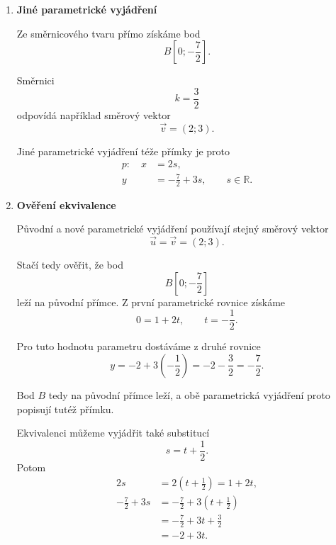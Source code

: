 \begin{example}
\begin{enumerate}[label=\alph*), leftmargin=2em]
        Směrnicový tvar přímky je
        \[
            p:y=\frac{3}{2}x-\frac{7}{2}.
        \]

        Stejný výsledek můžeme získat přímo z parametrického
        vyjádření:
        \[
            k=\frac{3}{2}
        \]
        a
        \[
            q
            =
            -2-\frac{3}{2}\cdot1
            =
            -\frac{7}{2}.
        \]

        \item \textbf{Jiné parametrické vyjádření}

        Ze směrnicového tvaru přímo získáme bod
        \[
            B\left[0;-\frac{7}{2}\right].
        \]

        Směrnici
        \[
            k=\frac{3}{2}
        \]
        odpovídá například směrový vektor
        \[
            \vec{v}=(2;3).
        \]

        Jiné parametrické vyjádření téže přímky je proto
        \[
            \begin{aligned}
                p:\quad x&=2s,\\
                         y&=-\frac{7}{2}+3s,
                         \qquad s\in\mathbb{R}.
            \end{aligned}
        \]

        \item \textbf{Ověření ekvivalence}

        Původní a nové parametrické vyjádření používají stejný směrový
        vektor
        \[
            \vec{u}=\vec{v}=(2;3).
        \]

        Stačí tedy ověřit, že bod
        \[
            B\left[0;-\frac{7}{2}\right]
        \]
        leží na původní přímce. Z první parametrické rovnice získáme
        \[
            0=1+2t,
            \qquad
            t=-\frac{1}{2}.
        \]

        Pro tuto hodnotu parametru dostáváme z druhé rovnice
        \[
            y
            =
            -2+3\left(-\frac{1}{2}\right)
            =
            -2-\frac{3}{2}
            =
            -\frac{7}{2}.
        \]

        Bod $B$ tedy na původní přímce leží, a obě parametrická
        vyjádření proto popisují tutéž přímku.

        Ekvivalenci můžeme vyjádřit také substitucí
        \[
            s=t+\frac{1}{2}.
        \]
        Potom
        \begin{align*}
            2s
            &=
            2\left(t+\frac{1}{2}\right)
            =
            1+2t,\\
            -\frac{7}{2}+3s
            &=
            -\frac{7}{2}
            +3\left(t+\frac{1}{2}\right)\\
            &=
            -\frac{7}{2}+3t+\frac{3}{2}\\
            &=
            -2+3t.
        \end{align*}
    \end{enumerate}


\end{example}
